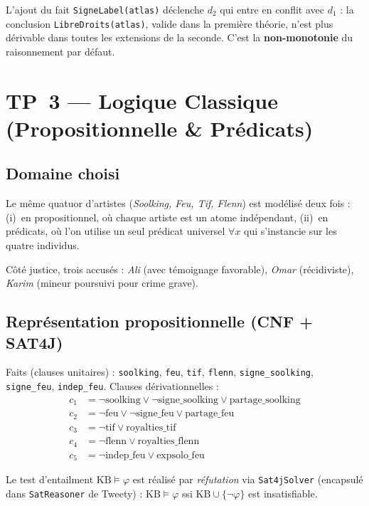 \documentclass[11pt, a4paper]{article}
\newcommand{\code}[1]{\texttt{#1}}
\begin{document}
\noindent L'ajout du fait \code{SigneLabel(atlas)} déclenche $d_2$ qui entre en
conflit avec $d_1$ : la conclusion \code{LibreDroits(atlas)}, valide dans la
première théorie, n'est plus dérivable dans toutes les extensions de la seconde.
C'est la \textbf{non-monotonie} du raisonnement par défaut.

\newpage
\section{TP~3 --- Logique Classique (Propositionnelle \& Prédicats)}

\subsection*{Domaine choisi}

Le même quatuor d'artistes (\emph{Soolking, Feu, Tif, Flenn}) est modélisé
deux fois : (i)~en propositionnel, où chaque artiste est un atome
indépendant, (ii)~en prédicats, où l'on utilise un seul prédicat universel
$\forall x$ qui s'instancie sur les quatre individus.

\noindent Côté justice, trois accusés : \emph{Ali} (avec témoignage favorable),
\emph{Omar} (récidiviste), \emph{Karim} (mineur poursuivi pour crime grave).

\subsection*{Représentation propositionnelle (CNF + SAT4J)}

Faits (clauses unitaires) : \code{soolking}, \code{feu}, \code{tif},
\code{flenn}, \code{signe\_soolking}, \code{signe\_feu}, \code{indep\_feu}.
Clauses dérivationnelles :
\begin{align*}
c_1 &= \lnot\text{soolking} \lor \lnot\text{signe\_soolking} \lor \text{partage\_soolking} \\
c_2 &= \lnot\text{feu} \lor \lnot\text{signe\_feu} \lor \text{partage\_feu} \\
c_3 &= \lnot\text{tif} \lor \text{royalties\_tif} \\
c_4 &= \lnot\text{flenn} \lor \text{royalties\_flenn} \\
c_5 &= \lnot\text{indep\_feu} \lor \text{expsolo\_feu}
\end{align*}

\noindent Le test d'entailment $\text{KB} \models \varphi$ est réalisé par
\emph{réfutation} via \code{Sat4jSolver} (encapsulé dans \code{SatReasoner} de
Tweety) : $\text{KB} \models \varphi$ ssi $\text{KB} \cup \{\lnot\varphi\}$
est insatisfiable.
\end{document}
